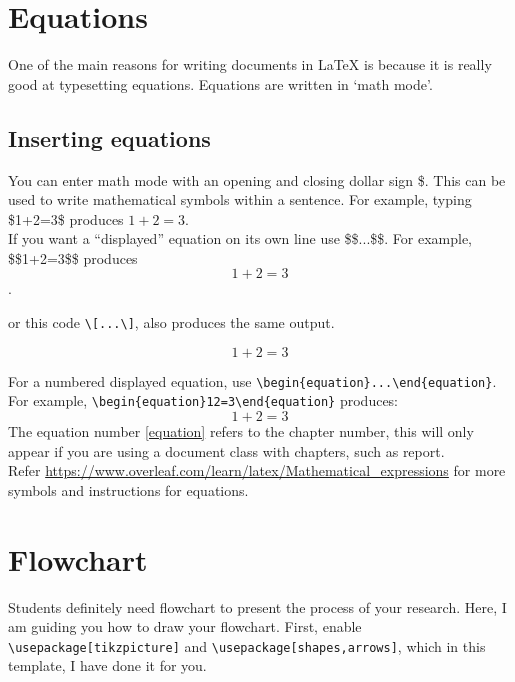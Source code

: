 \section{Equations}
One of the main reasons for writing documents in {\LaTeX} is because it is really good at
typesetting equations. Equations are written in ‘math mode’.

\subsection{Inserting equations}
You can enter math mode with an opening and closing dollar sign \$. This can be used to write mathematical symbols within a sentence. For example, typing \$1+2=3\$ produces $1 + 2 = 3$.\\

If you want a “displayed” equation on its own line use \$\$...\$\$. For example, \$\$1+2=3\$\$
produces $$1+2=3$$.

\noindent or this code \verb+\[...\]+, also produces the same output.

\[ 1+2=3 \]

For a numbered displayed equation, use \verb+\begin{equation}...\end{equation}+.
For example, \verb+\begin{equation}1+\verb+2=3\end{equation}+ produces: 
\begin{equation}
\label{equation}
1+2=3
\end{equation}
The equation number \ref{equation} refers to the chapter number, this will only appear if you are using a document class with chapters, such as report.\\

Refer \url{https://www.overleaf.com/learn/latex/Mathematical_expressions} for more symbols and
instructions for equations.



 \section{Flowchart}
 
Students definitely need flowchart to present the process of your research. Here, I am guiding you how to draw your flowchart. First, enable \verb+\usepackage[tikzpicture]+ and \verb+\usepackage[shapes,arrows]+, which in this template, I have done it for you.\\

